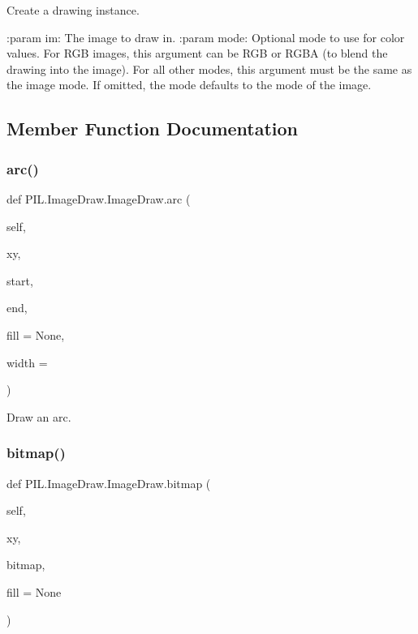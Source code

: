 \begin{DoxyVerb}Create a drawing instance.

:param im: The image to draw in.
:param mode: Optional mode to use for color values.  For RGB
   images, this argument can be RGB or RGBA (to blend the
   drawing into the image).  For all other modes, this argument
   must be the same as the image mode.  If omitted, the mode
   defaults to the mode of the image.
\end{DoxyVerb}
 

\subsection{Member Function Documentation}
\mbox{\label{classPIL_1_1ImageDraw_1_1ImageDraw_af6f59e7bea76696bb9caf55a830587da}} 
\subsubsection{\texorpdfstring{arc()}{arc()}}
{\footnotesize\ttfamily def P\+I\+L.\+Image\+Draw.\+Image\+Draw.\+arc (\begin{DoxyParamCaption}\item[{}]{self,  }\item[{}]{xy,  }\item[{}]{start,  }\item[{}]{end,  }\item[{}]{fill = {\ttfamily None},  }\item[{}]{width = {} }\end{DoxyParamCaption})}

\begin{DoxyVerb}Draw an arc.\end{DoxyVerb}
 \mbox{\label{classPIL_1_1ImageDraw_1_1ImageDraw_ab6e55ef20bfd89284ce048f88aa109fa}} 
\subsubsection{\texorpdfstring{bitmap()}{bitmap()}}
{\footnotesize\ttfamily def P\+I\+L.\+Image\+Draw.\+Image\+Draw.\+bitmap (\begin{DoxyParamCaption}\item[{}]{self,  }\item[{}]{xy,  }\item[{}]{bitmap,  }\item[{}]{fill = {\ttfamily None} }\end{DoxyParamCaption})}

